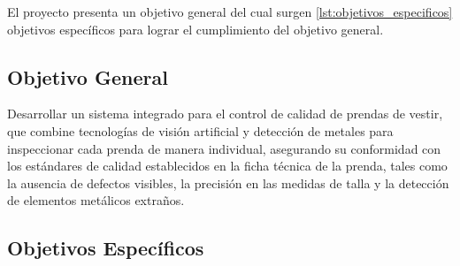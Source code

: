 El proyecto presenta un objetivo general del cual surgen \ref{lst:objetivos_especificos} objetivos específicos para lograr el cumplimiento del objetivo general.

\subsection{Objetivo General}

Desarrollar un sistema integrado para el control de calidad de prendas de vestir, que combine tecnologías de visión artificial y detección de metales para inspeccionar cada prenda de manera individual, asegurando su conformidad con los estándares de calidad establecidos en la ficha técnica de la prenda, tales como la ausencia de defectos visibles, la precisión en las medidas de talla y la detección de elementos metálicos extraños.

\subsection{Objetivos Específicos}

